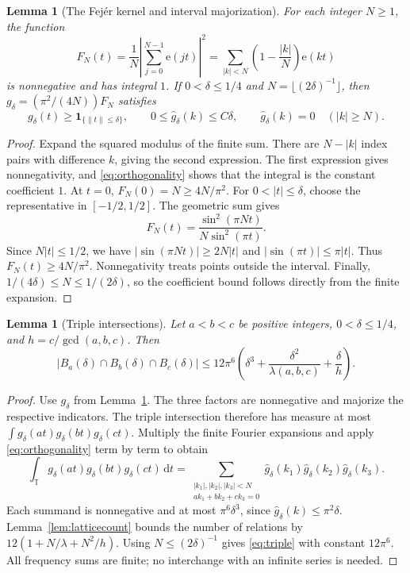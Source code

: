\documentclass[12pt,leqno]{article}
\numberwithin{equation}{section}
\newtheorem{lemma}[theorem]{Lemma}
\theoremstyle{remark}
\newcommand{\LRtorus}{\mathbb T}
\newcommand{\LRindicator}{\mathbf 1}
\newcommand{\LRdifferential}{\,\mathrm d}
\begin{document}
\begin{lemma}[The Fej\'er kernel and interval majorization]\label{lem:fejer}
For each integer $N\ge1$, the function
\[
F_N(t)=\frac1N\left|\sum_{j=0}^{N-1}\mathrm e(jt)\right|^2
=\sum_{|k|<N}\left(1-\frac{|k|}N\right)\mathrm e(kt)
\]
is nonnegative and has integral $1$. If $0<\delta\le1/4$ and $N=\lfloor(2\delta)^{-1}\rfloor$, then
$g_\delta=(\pi^2/(4N))F_N$ satisfies
\[
g_\delta(t)\ge\LRindicator_{\{\|t\|\le\delta\}},\qquad
0\le\widehat g_\delta(k)\le C\delta,\qquad
\widehat g_\delta(k)=0\quad(|k|\ge N).
\]
\end{lemma}
\begin{proof}
Expand the squared modulus of the finite sum. There are $N-|k|$ index pairs with difference $k$, giving the second expression. The first expression gives nonnegativity, and \eqref{eq:orthogonality} shows that the integral is the constant coefficient $1$. At $t=0$, $F_N(0)=N\ge4N/\pi^2$. For $0<|t|\le\delta$, choose the representative in $[-1/2,1/2]$. The geometric sum gives
\[
F_N(t)=\frac{\sin^2(\pi Nt)}{N\sin^2(\pi t)}.
\]
Since $N|t|\le1/2$, we have $|\sin(\pi Nt)|\ge2N|t|$ and $|\sin(\pi t)|\le\pi|t|$. Thus $F_N(t)\ge4N/\pi^2$. Nonnegativity treats points outside the interval. Finally, $1/(4\delta)\le N\le1/(2\delta)$, so the coefficient bound follows directly from the finite expansion.
\end{proof}

\begin{lemma}[Triple intersections]\label{lem:triple}
Let $a<b<c$ be positive integers, $0<\delta\le1/4$, and $h=c/\gcd(a,b,c)$. Then
\begin{equation}\label{eq:triple}
|B_a(\delta)\cap B_b(\delta)\cap B_c(\delta)|
\le12\pi^6\left(\delta^3+\frac{\delta^2}{\lambda(a,b,c)}+\frac\delta h\right).
\end{equation}
\end{lemma}
\begin{proof}
Use $g_\delta$ from Lemma~\ref{lem:fejer}. The three factors are nonnegative and majorize the respective indicators. The triple intersection therefore has measure at most $\int g_\delta(at)g_\delta(bt)g_\delta(ct)$. Multiply the finite Fourier expansions and apply \eqref{eq:orthogonality} term by term to obtain
\[
\int_{\LRtorus}g_\delta(at)g_\delta(bt)g_\delta(ct)\LRdifferential t
=\sum_{\substack{|k_1|,|k_2|,|k_3|<N\\ak_1+bk_2+ck_3=0}}
\widehat g_\delta(k_1)\widehat g_\delta(k_2)\widehat g_\delta(k_3).
\]
Each summand is nonnegative and at most $\pi^6\delta^3$, since $\widehat g_\delta(k)\le\pi^2\delta$. Lemma~\ref{lem:latticecount} bounds the number of relations by $12(1+N/\lambda+N^2/h)$. Using $N\le(2\delta)^{-1}$ gives \eqref{eq:triple} with constant $12\pi^6$. All frequency sums are finite; no interchange with an infinite series is needed.
\end{proof}
\end{document}
